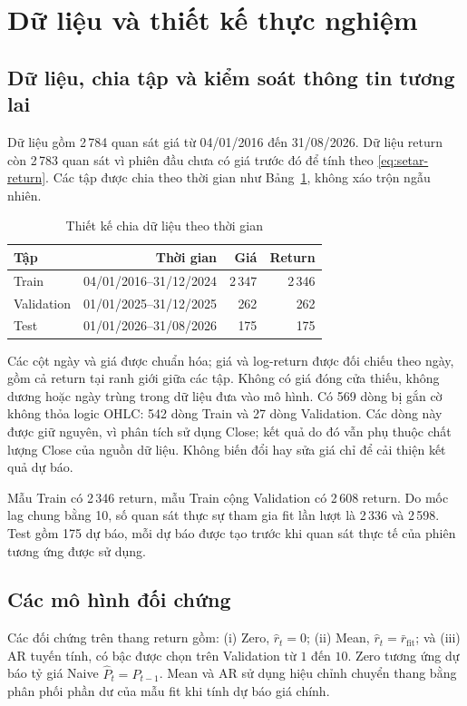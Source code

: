 \documentclass[a4paper,reqno,oneside]{book}
\numberwithin{equation}{chapter}
\begin{document}
\section{Dữ liệu và thiết kế thực nghiệm}

\subsection{Dữ liệu, chia tập và kiểm soát thông tin tương lai}

Dữ liệu gồm 2\,784 quan sát giá từ 04/01/2016 đến 31/08/2026. Dữ liệu return còn 2\,783 quan sát vì phiên đầu chưa có giá trước đó để tính theo \eqref{eq:setar-return}. Các tập được chia theo thời gian như Bảng~\ref{tab:setar-splits}, không xáo trộn ngẫu nhiên.

\begin{table}[htbp]
\centering\small
\caption{Thiết kế chia dữ liệu theo thời gian}
\label{tab:setar-splits}
\begin{tabular}{lrrr}
\toprule
Tập & Thời gian & Giá & Return \\
\midrule
Train & 04/01/2016--31/12/2024 & 2\,347 & 2\,346 \\
Validation & 01/01/2025--31/12/2025 & 262 & 262 \\
Test & 01/01/2026--31/08/2026 & 175 & 175 \\
\bottomrule
\end{tabular}
\end{table}

Các cột ngày và giá được chuẩn hóa; giá và log-return được đối chiếu theo ngày, gồm cả return tại ranh giới giữa các tập. Không có giá đóng cửa thiếu, không dương hoặc ngày trùng trong dữ liệu đưa vào mô hình. Có 569 dòng bị gắn cờ không thỏa logic OHLC: 542 dòng Train và 27 dòng Validation. Các dòng này được giữ nguyên, vì phân tích sử dụng Close; kết quả do đó vẫn phụ thuộc chất lượng Close của nguồn dữ liệu. Không biến đổi hay sửa giá chỉ để cải thiện kết quả dự báo.

Mẫu Train có 2\,346 return, mẫu Train cộng Validation có 2\,608 return. Do mốc lag chung bằng 10, số quan sát thực sự tham gia fit lần lượt là 2\,336 và 2\,598. Test gồm 175 dự báo, mỗi dự báo được tạo trước khi quan sát thực tế của phiên tương ứng được sử dụng.

\subsection{Các mô hình đối chứng}

Các đối chứng trên thang return gồm: (i) Zero, $\widehat r_t=0$; (ii) Mean, $\widehat r_t=\bar r_{\mathrm{fit}}$; và (iii) AR tuyến tính, có bậc được chọn trên Validation từ $1$ đến $10$. Zero tương ứng dự báo tỷ giá Naive $\widehat P_t=P_{t-1}$. Mean và AR sử dụng hiệu chỉnh chuyển thang bằng phân phối phần dư của mẫu fit khi tính dự báo giá chính.
\end{document}
